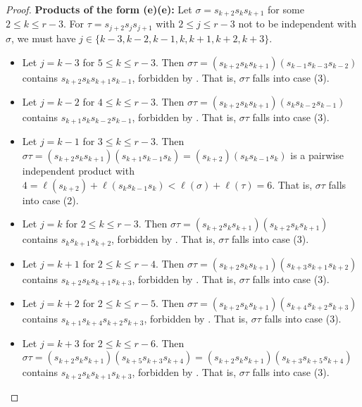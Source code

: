 \documentclass[10pt,a4paper]{amsart}
\begin{document}
\begin{proof}
\noindent \textbf{Products of the form (e)(e):}
    Let $\sigma = s_{k+2}s_ks_{k+1}$ for some $2 \le k \le r-3$. For $\tau=s_{j+2}s_js_{j+1}$ with $2 \le j \le r-3$ not to be independent with $\sigma$, we must have $j\in\{k-3,k-2,k-1,k,k+1,k+2,k+3\}$.
    \begin{itemize}
        \item Let $j=k-3$ for $5\leq k\leq r-3$. Then $\sigma\tau=(s_{k+2}s_ks_{k+1})(s_{k-1}s_{k-3}s_{k-2})$ contains $s_{k+2}s_ks_{k+1}s_{k-1}$, forbidden by . That is, $\sigma\tau$ falls into case (3).
        \item Let $j=k-2$ for $4\leq k\leq r-3$. Then $\sigma\tau=(s_{k+2}s_ks_{k+1})(s_{k}s_{k-2}s_{k-1})$ contains $s_{k+1}s_ks_{k-2}s_{k-1}$, forbidden by . That is, $\sigma\tau$ falls into case (3).
        \item Let $j=k-1$ for $3\leq k\leq r-3$. Then $\sigma\tau=(s_{k+2}s_ks_{k+1})(s_{k+1}s_{k-1}s_{k})=(s_{k+2})(s_ks_{k-1}s_k)$ is a pairwise independent product with $4=\ell(s_{k+2})+\ell(s_{k}s_{k-1}s_k)<\ell(\sigma)+\ell(\tau)=6$. That is, $\sigma\tau$ falls into case (2).
        \item Let $j=k$ for $2\leq k\leq r-3$. Then $\sigma\tau=(s_{k+2}s_ks_{k+1})(s_{k+2}s_ks_{k+1})$ contains $s_ks_{k+1}s_{k+2}$, forbidden by . That is, $\sigma\tau$ falls into case (3).
        \item Let $j=k+1$ for $2\leq k\leq r-4$. Then $\sigma\tau=(s_{k+2}s_ks_{k+1})(s_{k+3}s_{k+1}s_{k+2})$ contains $s_{k+2}s_ks_{k+1}s_{k+3}$, forbidden by . That is, $\sigma\tau$ falls into case (3).
        \item Let $j=k+2$ for $2\leq k\leq r-5$. Then $\sigma\tau=(s_{k+2}s_ks_{k+1})(s_{k+4}s_{k+2}s_{k+3})$ contains $s_{k+1}s_{k+4}s_{k+2}s_{k+3}$, forbidden by . That is, $\sigma\tau$ falls into case (3).
        \item Let $j=k+3$ for $2\leq k\leq r-6$. Then $\sigma\tau=(s_{k+2}s_ks_{k+1})(s_{k+5}s_{k+3}s_{k+4})=(s_{k+2}s_ks_{k+1})(s_{k+3}s_{k+5}s_{k+4})$ contains $s_{k+2}s_ks_{k+1}s_{k+3}$, forbidden by . That is, $\sigma\tau$ falls into case (3). 
    \end{itemize}
    
\smallskip


\end{proof}
\end{document}
